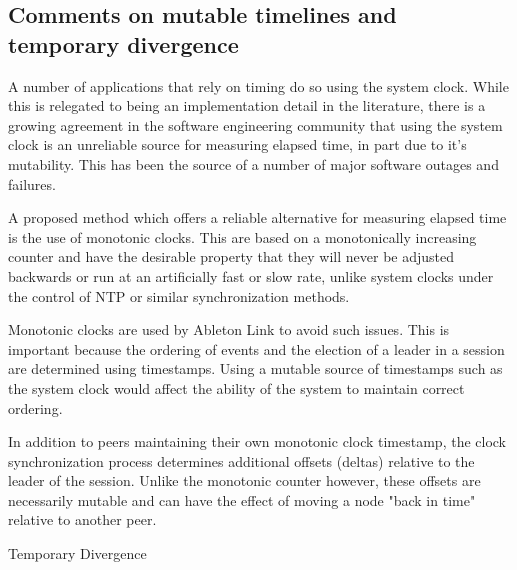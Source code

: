 \documentclass[11pt]{article} %
\theoremstyle{plain}
\theoremstyle{definition}
\begin{document}
\subsection{Comments on mutable timelines and temporary divergence}

A number of applications that rely on timing do so using the system clock.
While this is relegated to being an implementation detail in the literature,
there is a growing agreement in the software engineering community that using
the system clock is an unreliable source for measuring elapsed time, in part
due to it's mutability. This has been the source of a number of major software
outages and failures\cite{monotonic}.

A proposed method which offers a reliable alternative for measuring elapsed
time is the use of monotonic clocks. This are based on a monotonically
increasing counter and have the desirable property that they will never be
adjusted backwards or run at an artificially fast or slow rate, unlike system
clocks under the control of NTP or similar synchronization methods.

Monotonic clocks are used by Ableton Link\cite{goltz2018ableton} to avoid such
issues. This is important because the ordering of events and the election of a
leader in a session are determined using timestamps. Using a mutable source of
timestamps such as the system clock would affect the ability of the system to
maintain correct ordering.

In addition to peers maintaining their own monotonic clock timestamp, the clock
synchronization process determines additional offsets (deltas) relative to the
leader of the session. Unlike the monotonic counter however, these offsets are
necessarily mutable and can have the effect of moving a node "back in time"
relative to another peer.

\begin{algorithm}
  \caption{Temporary Divergence}\label{linkdivergence}
\begin{algorithmic}[1]
\item{ }
\end{algorithmic}
\end{algorithm}
\end{document}
